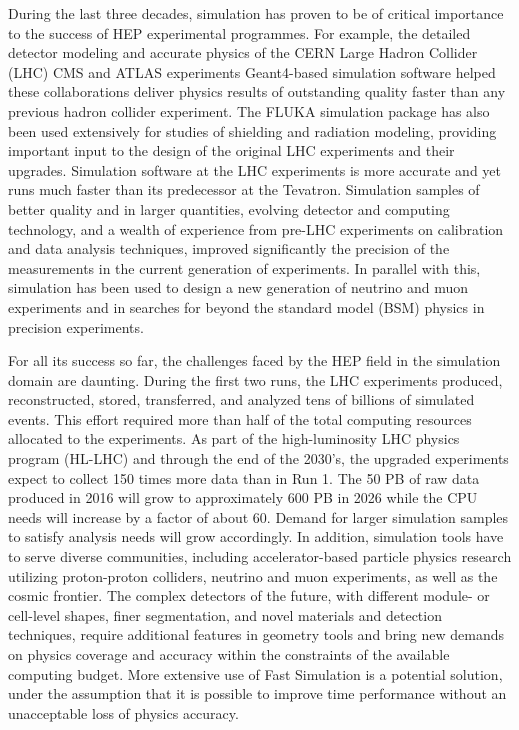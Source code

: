 \documentclass[12pt,a4paper]{article}
\begin{document}
During the last three decades, simulation has proven to be of critical
importance to the success of HEP experimental programmes. For example,
the detailed detector modeling and accurate physics of the CERN Large
Hadron Collider (LHC) CMS and ATLAS experiments Geant4-based simulation
software helped these collaborations deliver physics results of
outstanding quality faster than any previous hadron collider experiment.
The FLUKA simulation package has also been used extensively for studies
of shielding and radiation modeling, providing important input to the
design of the original LHC experiments and their upgrades. Simulation
software at the LHC experiments is more accurate and yet runs much
faster than its predecessor at the Tevatron. Simulation samples of
better quality and in larger quantities, evolving detector and computing
technology, and a wealth of experience from pre-LHC experiments on
calibration and data analysis techniques, improved significantly the
precision of the measurements in the current generation of experiments.
In parallel with this, simulation has been used to design a new
generation of neutrino and muon experiments and in searches for beyond
the standard model (BSM) physics in precision experiments.

For all its success so far, the challenges faced by the HEP field in the
simulation domain are daunting. During the first two runs, the LHC
experiments produced, reconstructed, stored, transferred, and analyzed
tens of billions of simulated events. This effort required more than
half of the total computing resources allocated to the experiments. As
part of the high-luminosity LHC physics program (HL-LHC) and through the
end of the 2030's, the upgraded experiments expect to collect 150 times
more data than in Run 1. The 50 PB of raw data produced in 2016 will
grow to approximately 600 PB in 2026 while the CPU needs will increase
by a factor of about 60. Demand for larger simulation samples to satisfy
analysis needs will grow accordingly. In addition, simulation tools have
to serve diverse communities, including accelerator-based particle
physics research utilizing proton-proton colliders, neutrino and muon
experiments, as well as the cosmic frontier. The complex detectors of
the future, with different module- or cell-level shapes, finer
segmentation, and novel materials and detection techniques, require
additional features in geometry tools and bring new demands on physics
coverage and accuracy within the constraints of the available computing
budget. More extensive use of Fast Simulation is a potential solution,
under the assumption that it is possible to improve time performance
without an unacceptable loss of physics accuracy.
\end{document}
